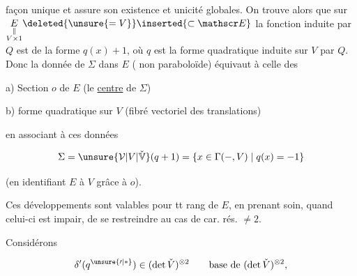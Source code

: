 
façon unique et assure son existence et unicité globales. On  trouve alors que sur $\underset{\substack{\Vert\\V\times1}}{E}\deleted{\unsure{=V}}\inserted{\subset\mathscr E}$ la fonction induite par $Q$ est de la forme $q(x)+1$, où $q$ est la forme quadratique  induite sur $V$ par $Q$. Donc la donnée de $\Sigma$ dans $E$ ( non paraboloïde) équivaut à celle des

a) Section $o$ de $E$ (le \uline{centre} de $\Sigma$)

b) forme quadratique  sur $V$ (fibré vectoriel des translations)

en associant à ces données

\[
\Sigma=\unsure{\mathcal V|V|\check{\mathbb V}}(q+1)=\{x\in\Gamma(-,V)\mid q(x)=-1\}
\]

(en identifiant $E$ à $V$ grâce à $o$).

Ces développements sont valables pour tt rang de $E$, en prenant soin, quand celui-ci est impair,  de se restreindre au cas de  car. rés. $\ne2$.

Considérons \deleted{\unsure{$\delta$}}

\[
\delta'(q^{\unsure{\prime|\ast}})\in(\det\check V)^{\otimes2}\qquad\text{base de }(\det\check V)^{\otimes2},
\]

